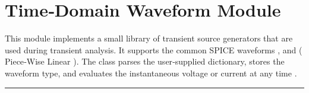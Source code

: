 \documentclass[letterpaper,10pt,english]{sphinxmanual}
\begin{document}
\sphinxstepscope


\chapter{Time‑Domain Waveform Module}
\label{\detokenize{waveforms:timedomain-waveform-module}}\label{\detokenize{waveforms:waveforms-module}}\label{\detokenize{waveforms::doc}}
\sphinxAtStartPar
This module implements a small library of transient source generators that are used during
transient analysis.  It supports the common SPICE waveforms ,  and 
( Piece‑Wise Linear ).  The {\hyperref[\detokenize{waveforms:Waveform}]{}} class parses the user‑supplied dictionary,
stores the waveform type, and evaluates the instantaneous voltage or current at any time .


\bigskip\hrule\bigskip

\end{document}

